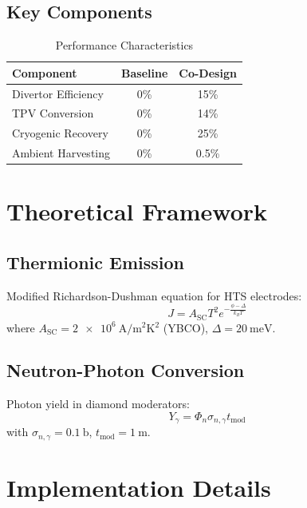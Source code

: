 \documentclass{article}
\begin{document}
\subsection{Key Components}
\begin{table}[ht]
    \centering
    \caption{Performance Characteristics}
    \label{tab:performance}
    \begin{tabular}{lcc}
        \toprule
        Component & Baseline & Co-Design \\
        \midrule
        Divertor Efficiency & 0\% & 15\% \\
        TPV Conversion & 0\% & 14\% \\
        Cryogenic Recovery & 0\% & 25\% \\
        Ambient Harvesting & 0\% & 0.5\% \\
        \bottomrule
    \end{tabular}
\end{table}

\section{Theoretical Framework}
\label{sec:theory}

\subsection{Thermionic Emission}
Modified Richardson-Dushman equation for HTS electrodes:
\begin{equation}
    J = A_{\text{SC}}T^2 e^{-\frac{\phi - \Delta}{k_B T}}
\end{equation}
where \( A_{\text{SC}} = \SI{2e6}{\ampere\per\square\meter\kelvin^2} \) (YBCO), \( \Delta = \SI{20}{\milli\electronvolt} \).

\subsection{Neutron-Photon Conversion}
Photon yield in diamond moderators:
\begin{equation}
    Y_\gamma = \Phi_n \sigma_{n,\gamma} t_{\text{mod}}
\end{equation}
with \( \sigma_{n,\gamma} = \SI{0.1}{\barn} \), \( t_{\text{mod}} = \SI{1}{\meter} \).

\section{Implementation Details}
\label{sec:implementation}
\end{document}
